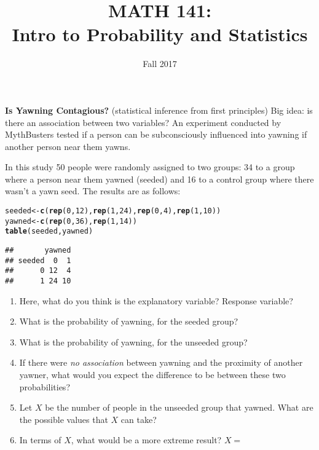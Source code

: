 \documentclass[10pt]{article}\usepackage[]{graphicx}\usepackage[]{color}
\title{MATH 141:\\Intro to Probability and Statistics}
\date{Fall 2017}
\makeatletter
\newcommand{\hlnum}[1]{\textcolor[rgb]{0.686,0.059,0.569}{#1}}%
\newcommand{\hlstd}[1]{\textcolor[rgb]{0.345,0.345,0.345}{#1}}%
\newcommand{\hlkwb}[1]{\textcolor[rgb]{0.69,0.353,0.396}{#1}}%
\newcommand{\hlkwd}[1]{\textcolor[rgb]{0.737,0.353,0.396}{\textbf{#1}}}%
\newenvironment{kframe}{%
 \def\at@end@of@kframe{}%
 \ifinner\ifhmode%
  \def\at@end@of@kframe{\end{minipage}}%
  \begin{minipage}{\columnwidth}%
 \fi\fi%
 \def\FrameCommand##1{\hskip\@totalleftmargin \hskip-\fboxsep
 \colorbox{shadecolor}{##1}\hskip-\fboxsep
     \hskip-\linewidth \hskip-\@totalleftmargin \hskip\columnwidth}%
 \MakeFramed {\advance\hsize-\width
   \@totalleftmargin\z@ \linewidth\hsize
   \@setminipage}}%
 {\par\unskip\endMakeFramed%
 \at@end@of@kframe}
\newenvironment{knitrout}{}{} %
\newcommand{\ans}{\vspace{0.25in}}
\makeatother
\begin{document}
\textbf{Is Yawning Contagious?} (statistical inference from first principles)  
Big idea: is there an association between two variables?  An experiment conducted by MythBusters tested if a person can be subconsciously influenced into yawning if another person near them yawns.

In this study 50 people were randomly assigned to two groups: 34 to a group where a person near them yawned (seeded) and 16 to a control group where there wasn't a yawn seed. The results are as follows:

\begin{knitrout}
\color{fgcolor}\begin{kframe}
\begin{alltt}
\hlstd{seeded} \hlkwb{<-} \hlkwd{c}\hlstd{(}\hlkwd{rep}\hlstd{(}\hlnum{0}\hlstd{,} \hlnum{12}\hlstd{),} \hlkwd{rep}\hlstd{(}\hlnum{1}\hlstd{,} \hlnum{24}\hlstd{),} \hlkwd{rep}\hlstd{(}\hlnum{0}\hlstd{,} \hlnum{4}\hlstd{),} \hlkwd{rep}\hlstd{(}\hlnum{1}\hlstd{,} \hlnum{10}\hlstd{))}
\hlstd{yawned} \hlkwb{<-} \hlkwd{c}\hlstd{(}\hlkwd{rep}\hlstd{(}\hlnum{0}\hlstd{,} \hlnum{36}\hlstd{),} \hlkwd{rep}\hlstd{(}\hlnum{1}\hlstd{,} \hlnum{14}\hlstd{))}
\hlkwd{table}\hlstd{(seeded, yawned)}
\end{alltt}
\begin{verbatim}
##       yawned
## seeded  0  1
##      0 12  4
##      1 24 10
\end{verbatim}
\end{kframe}
\end{knitrout}


\begin{enumerate}
  \item Here, what do you think is the explanatory variable?  Response variable? 
  \ans
  \item What is the probability of yawning, for the seeded group?
  \ans
  \item What is the probability of yawning, for the unseeded group?
  \ans
  \item If there were \emph{no association} between yawning and the proximity of another yawner, what would you expect the difference to be between these two probabilities?
  \ans
  \item Let $X$ be the number of people in the unseeded group that yawned.  What are the possible values that $X$ can take?
  \ans
  \item In terms of $X$, what would be a more extreme result?  $X = $
\end{enumerate}
\end{document}
